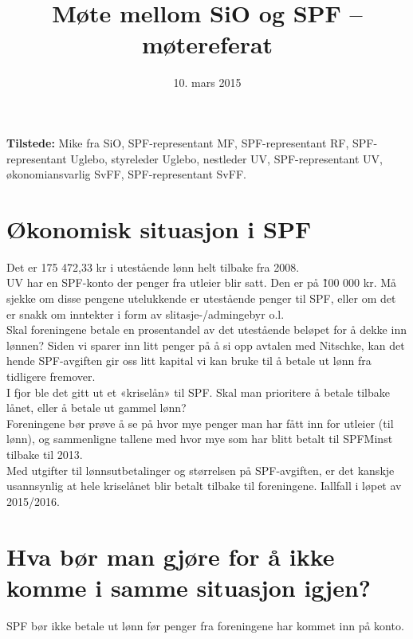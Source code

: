 \documentclass{article}[12pt]
\begin{document}
\title{Møte mellom SiO og SPF -- møtereferat}
\date{10. mars 2015}
\maketitle
\textbf{Tilstede: }
Mike fra SiO, SPF-representant MF, SPF-representant RF, SPF-representant Uglebo, 
styreleder Uglebo, nestleder UV, SPF-representant UV, økonomiansvarlig SvFF, 
SPF-representant SvFF.

\section{Økonomisk situasjon i SPF}
\noindent Det er 175 472,33 kr i utestående lønn helt tilbake fra 2008.\\

\noindent UV har en SPF-konto der penger fra utleier blir satt. 
Den er på \~100 000 kr.
Må sjekke om disse pengene utelukkende er utestående penger til SPF,
eller om det er snakk om inntekter i form av slitasje-/admingebyr o.l.\\

\noindent Skal foreningene betale en prosentandel av det utestående beløpet
for å dekke inn lønnen? Siden vi sparer inn litt penger på
å si opp avtalen med Nitschke, kan det hende SPF-avgiften gir oss
litt kapital vi kan bruke til å betale ut lønn fra tidligere fremover.\\

\noindent I fjor ble det gitt ut et «kriselån» til SPF.
Skal man prioritere
å betale tilbake lånet, eller å betale ut gammel lønn?\\

\noindent Foreningene bør prøve å se på hvor mye penger man har fått inn for 
utleier (til lønn), og sammenligne tallene med hvor mye som har 
blitt betalt til SPF\. Minst tilbake til 2013.\\

\noindent Med utgifter til lønnsutbetalinger og størrelsen på SPF-avgiften,
er det kanskje usannsynlig at hele kriselånet blir betalt tilbake
til foreningene. Iallfall i løpet av 2015/2016.\\

\section{Hva bør man gjøre for å ikke komme i samme situasjon igjen?}

\noindent SPF bør ikke betale ut lønn før penger 
fra foreningene har kommet inn på konto.\\
\end{document}
